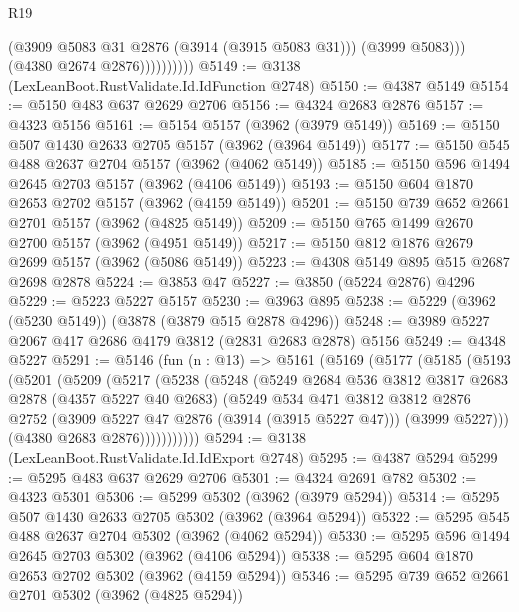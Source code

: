 \begin{lexlean}{R19}
\begin{coremodule}
                          (@3909 @5083 @31 @2876 (@3914 (@3915 @5083 @31)))
                          (@3999 @5083)))
                      (@4380 @2674 @2876))))))))))
@5149 := @3138 (LexLeanBoot.RustValidate.Id.IdFunction @2748)
@5150 := @4387 @5149
@5154 := @5150 @483 @637 @2629 @2706
@5156 := @4324 @2683 @2876
@5157 := @4323 @5156
@5161 := @5154 @5157 (@3962 (@3979 @5149))
@5169 := @5150 @507 @1430 @2633 @2705 @5157 (@3962 (@3964 @5149))
@5177 := @5150 @545 @488 @2637 @2704 @5157 (@3962 (@4062 @5149))
@5185 := @5150 @596 @1494 @2645 @2703 @5157 (@3962 (@4106 @5149))
@5193 := @5150 @604 @1870 @2653 @2702 @5157 (@3962 (@4159 @5149))
@5201 := @5150 @739 @652 @2661 @2701 @5157 (@3962 (@4825 @5149))
@5209 := @5150 @765 @1499 @2670 @2700 @5157 (@3962 (@4951 @5149))
@5217 := @5150 @812 @1876 @2679 @2699 @5157 (@3962 (@5086 @5149))
@5223 := @4308 @5149 @895 @515 @2687 @2698 @2878
@5224 := @3853 @47
@5227 := @3850 (@5224 @2876) @4296
@5229 := @5223 @5227 @5157
@5230 := @3963 @895
@5238 := @5229 (@3962 (@5230 @5149)) (@3878 (@3879 @515 @2878 @4296))
@5248 := @3989 @5227 @2067 @417 @2686 @4179 @3812 (@2831 @2683 @2878) @5156
@5249 := @4348 @5227
@5291 := @5146
    (fun (n : @13) =>
    @5161
      (@5169
        (@5177
          (@5185
            (@5193
              (@5201
                (@5209
                  (@5217
                    (@5238
                      (@5248
                        (@5249
                          @2684
                          @536
                          @3812
                          @3817
                          @2683
                          @2878
                          (@4357 @5227 @40 @2683)
                          (@5249
                            @534
                            @471
                            @3812
                            @3812
                            @2876
                            @2752
                            (@3909 @5227 @47 @2876 (@3914 (@3915 @5227 @47)))
                            (@3999 @5227)))
                        (@4380 @2683 @2876)))))))))))
@5294 := @3138 (LexLeanBoot.RustValidate.Id.IdExport @2748)
@5295 := @4387 @5294
@5299 := @5295 @483 @637 @2629 @2706
@5301 := @4324 @2691 @782
@5302 := @4323 @5301
@5306 := @5299 @5302 (@3962 (@3979 @5294))
@5314 := @5295 @507 @1430 @2633 @2705 @5302 (@3962 (@3964 @5294))
@5322 := @5295 @545 @488 @2637 @2704 @5302 (@3962 (@4062 @5294))
@5330 := @5295 @596 @1494 @2645 @2703 @5302 (@3962 (@4106 @5294))
@5338 := @5295 @604 @1870 @2653 @2702 @5302 (@3962 (@4159 @5294))
@5346 := @5295 @739 @652 @2661 @2701 @5302 (@3962 (@4825 @5294))

\end{coremodule}
\end{lexlean}
